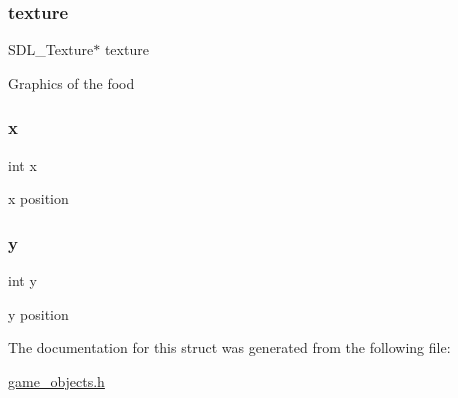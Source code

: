 \subsubsection{\texorpdfstring{texture}{texture}}
{\footnotesize\ttfamily S\+D\+L\+\_\+\+Texture$\ast$ texture}

Graphics of the food \mbox{\label{structfood__object_a6150e0515f7202e2fb518f7206ed97dc}} 
\subsubsection{\texorpdfstring{x}{x}}
{\footnotesize\ttfamily int x}

x position \mbox{\label{structfood__object_a0a2f84ed7838f07779ae24c5a9086d33}} 
\subsubsection{\texorpdfstring{y}{y}}
{\footnotesize\ttfamily int y}

y position 

The documentation for this struct was generated from the following file\+:\begin{DoxyCompactItemize}
\item 
\mbox{\hyperlink{game__objects_8h}{game\+\_\+objects.\+h}}\end{DoxyCompactItemize}
